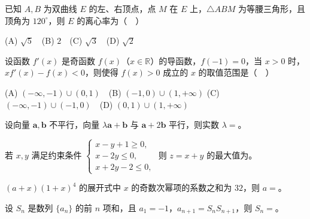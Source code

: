 \begin{question}
已知 $A,B$ 为双曲线 $E$ 的左、右顶点，点 $M$ 在 $E$ 上，$\triangle ABM$ 为等腰三角形，且顶角为 $120^\circ$，则 $E$ 的离心率为（　）

(A) $\sqrt5$　(B) $2$　(C) $\sqrt3$　(D) $\sqrt2$

\end{question}
\begin{question}
设函数 $f'(x)$ 是奇函数 $f(x)$（$x\in\mathbb R$）的导函数，$f(-1)=0$，当 $x>0$ 时，$xf'(x)-f(x)<0$，则使得 $f(x)>0$ 成立的 $x$ 的取值范围是（　）

(A) $(-\infty,-1)\cup(0,1)$　(B) $(-1,0)\cup(1,+\infty)$  
(C) $(-\infty,-1)\cup(-1,0)$　(D) $(0,1)\cup(1,+\infty)$

\end{question}

\begin{question}
设向量 $\boldsymbol a,\boldsymbol b$ 不平行，向量 $\lambda\boldsymbol a+\boldsymbol b$ 与 $\boldsymbol a+2\boldsymbol b$ 平行，则实数 $\lambda=$\gkblank{}。

\end{question}
\begin{question}
若 $x,y$ 满足约束条件 $\begin{cases}x-y+1\geqslant0,\\x-2y\leqslant0,\\x+2y-2\leqslant0,\end{cases}$ 则 $z=x+y$ 的最大值为\gkblank{}。

\end{question}
\begin{question}
$(a+x)(1+x)^4$ 的展开式中 $x$ 的奇数次幂项的系数之和为 $32$，则 $a=$\gkblank{}。

\end{question}
\begin{question}
设 $S_n$ 是数列 $\{a_n\}$ 的前 $n$ 项和，且 $a_1=-1$，$a_{n+1}=S_nS_{n+1}$，则 $S_n=$\gkblank{}。

\end{question}


